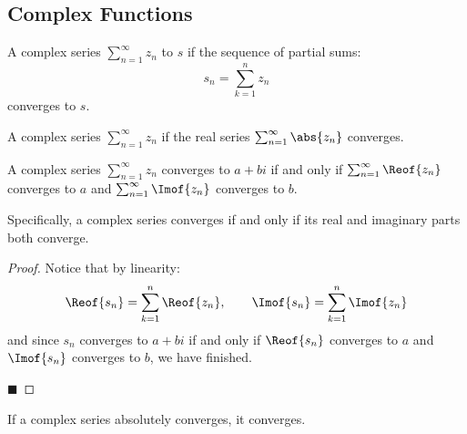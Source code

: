 \documentclass[10pt]{article}
\begin{document}


\bigskip

\subsection{Complex Functions}

\begin{defn*}

    A complex series $\sum_{n=1}^\infty z_n$  to $s$ if the sequence of partial sums:
    \[ s_n = \sum_{k=1}^n z_n \]
    converges to $s$.

    A complex series $\sum_{n=1}^\infty z_n$  if the real series $\sum_{n=1}^\infty\abs{z_n}$ converges.

\end{defn*}

\begin{prop*}

    A complex series $\sum_{n=1}^\infty z_n$ converges to $a+bi$ if and only if $\sum_{n=1}^\infty\Reof{z_n}$ converges to $a$ and $\sum_{n=1}^\infty\Imof{z_n}$ converges to $b$.

    Specifically, a complex series converges if and only if its real and imaginary parts both converge.

\end{prop*}

\begin{proof}

    Notice that by linearity:
    \[ \Reof{s_n} = \sum_{k=1}^n \Reof{z_n},\qquad \Imof{s_n} = \sum_{k=1}^n \Imof{z_n} \]
    and since $s_n$ converges to $a+bi$ if and only if $\Reof{s_n}$ converges to $a$ and $\Imof{s_n}$ converges to $b$, we have finished.

    \hfill$\blacksquare$

\end{proof}

\begin{prop*}

    If a complex series absolutely converges, it converges.

\end{prop*}
\end{document}
